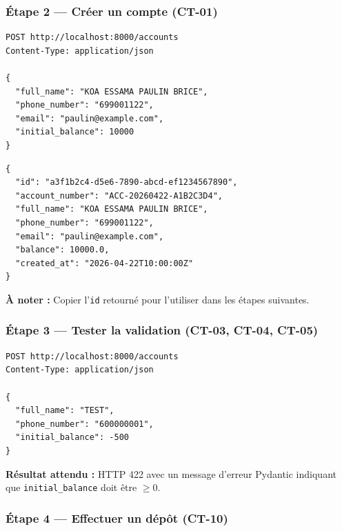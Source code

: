 \documentclass[12pt,a4paper]{article}
\begin{document}
\subsubsection{Étape 2 — Créer un compte (CT-01)}

\begin{lstlisting}[style=bash, caption={Appel POST /accounts}]
POST http://localhost:8000/accounts
Content-Type: application/json

{
  "full_name": "KOA ESSAMA PAULIN BRICE",
  "phone_number": "699001122",
  "email": "paulin@example.com",
  "initial_balance": 10000
}
\end{lstlisting}

\begin{lstlisting}[style=json, caption={Reponse attendue — HTTP 201}]
{
  "id": "a3f1b2c4-d5e6-7890-abcd-ef1234567890",
  "account_number": "ACC-20260422-A1B2C3D4",
  "full_name": "KOA ESSAMA PAULIN BRICE",
  "phone_number": "699001122",
  "email": "paulin@example.com",
  "balance": 10000.0,
  "created_at": "2026-04-22T10:00:00Z"
}
\end{lstlisting}

\begin{infobox}
\textbf{À noter :} Copier l'\texttt{id} retourné pour l'utiliser dans les étapes suivantes.
\end{infobox}

\subsubsection{Étape 3 — Tester la validation (CT-03, CT-04, CT-05)}

\begin{lstlisting}[style=bash, caption={Test CT-05 : solde negatif}]
POST http://localhost:8000/accounts
Content-Type: application/json

{
  "full_name": "TEST",
  "phone_number": "600000001",
  "initial_balance": -500
}
\end{lstlisting}

\begin{dangerbox}
\textbf{Résultat attendu :} HTTP 422 avec un message d'erreur Pydantic indiquant que \texttt{initial\_balance} doit être $\geq 0$.
\end{dangerbox}

\subsubsection{Étape 4 — Effectuer un dépôt (CT-10)}
\end{document}
